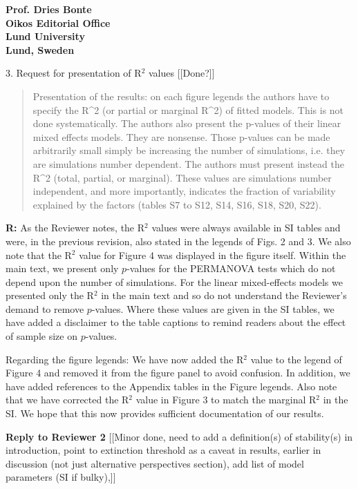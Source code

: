 \documentclass[12pt]{letter}
\begin{document}
\begin{letter}{\bf Prof. Dries Bonte\\
Oikos Editorial Office \\
Lund University \\
Lund, Sweden}
    \smallskip

    3. Request for presentation of R$^2$ values [[Done?]]

      \begin{quotation}
        Presentation of the results: on each figure legends the authors have to specify the R^2 (or partial  or marginal R^2) of fitted models. This is not done systematically. The authors also present the p-values of their linear mixed effects models. They are nonsense. Those p-values can be made arbitrarily small simply be increasing the number of simulations, i.e. they are simulations number dependent. The authors must present instead the R^2 (total, partial, or marginal). These values are simulations number independent, and more importantly, indicates the fraction of variability explained by the factors (tables S7 to S12, S14, S16, S18, S20, S22).
      \end{quotation}

      \smallskip

      \textbf{R:} As the Reviewer notes, the R$^2$ values were always available in SI tables and were, in the previous revision, also stated in the legends of Figs. 2 and 3. We also note that the R$^2$ value for Figure 4 was displayed in the figure itself. Within the main text, we present only $p$-values for the PERMANOVA tests which do not depend upon the number of simulations. For the linear mixed-effects models we presented only the R$^2$ in the main text and so do not understand the Reviewer's demand to remove $p$-values. Where these values are given in the SI tables, we have added a disclaimer to the table captions to remind readers about the effect of sample size on $p$-values.


      Regarding the figure legends: We have now added the R$^2$ value to the legend of Figure 4 and removed it from the figure panel to avoid confusion. In addition, we have added references to the Appendix tables in the Figure legends. Also note that we have corrected the R$^2$ value in Figure 3 to match the marginal R$^2$ in the SI. We hope that this now provides sufficient documentation of our results.



\clearpage

{\large\textbf{Reply to Reviewer 2}} [[Minor done, need to add a definition(s) of stability(s) in introduction, point to extinction threshold as a caveat in results, earlier in discussion (not just alternative perspectives section), add list of model parameters (SI if bulky),]]


\end{letter}
\end{document}
